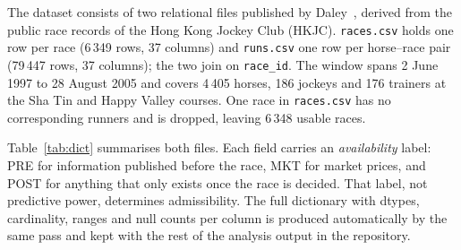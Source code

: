 The dataset consists of two relational files published by
Daley~\cite{ejeC_daley_hkracing}, derived from the public race records of
the Hong Kong Jockey Club (HKJC). \texttt{races.csv} holds one row per
race (6\,349 rows, 37 columns) and \texttt{runs.csv} one row per
horse--race pair (79\,447 rows, 37 columns); the two join on
\texttt{race\_id}. The window spans 2 June 1997 to 28 August 2005 and
covers 4\,405 horses, 186 jockeys and 176 trainers at the Sha Tin and
Happy Valley courses. One race in \texttt{races.csv} has no corresponding
runners and is dropped, leaving 6\,348 usable races.

Table~\ref{tab:dict} summarises both files. Each field carries an
\emph{availability} label: PRE for information published before the
race, MKT for market prices, and POST for anything that only exists once
the race is decided. That label, not predictive power, determines
admissibility. The full dictionary with dtypes, cardinality, ranges and
null counts per column is produced automatically by the same pass and
kept with the rest of the analysis output in the repository.

